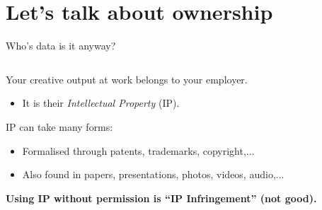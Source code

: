 \section[Who's data is it]{Let's talk about ownership}
\label{sec:ownership}

\begin{frame}{Who's data is it anyway?}

\begin{columns}[c]
    \begin{column}{0.45\textwidth}

    \begin{minipage}[t][.7\textheight]{\textwidth}

    Your creative output at work belongs to your employer.
    \begin{itemize}
    \item It is their \emph{Intellectual Property} (IP).
    \end{itemize}
    
    \vfill
    
    IP can take many forms:
    \begin{itemize}
        \item Formalised through patents, trademarks, copyright,...
        \item Also found in papers, presentations, photos, videos, audio,...
    \end{itemize}
    
    \vfill
    
    \textbf{Using IP without permission is ``IP Infringement'' (not good).}
    \end{minipage}%
    
    \end{column}


\end{columns}
\end{frame}
